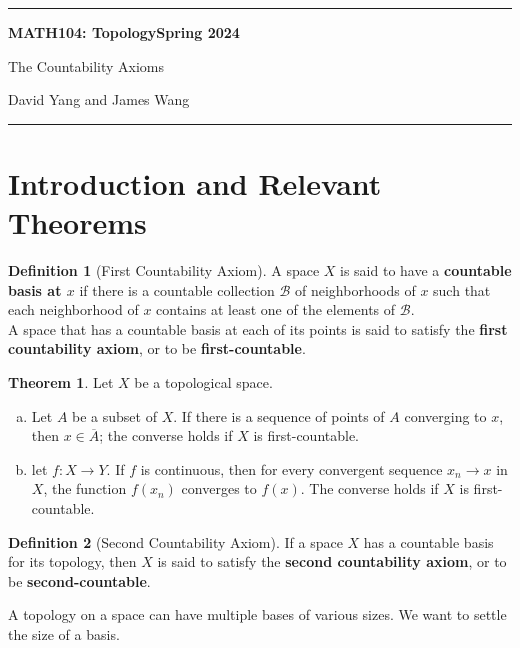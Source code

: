 \documentclass[11pt]{article}
\theoremstyle{definition}
\theoremstyle{theorem}
\newtheorem*{definition}{Definition}
\newtheorem*{theorem}{Theorem}
\begin{document}
	\hrule
	\begin{center}
        \textbf{MATH104: Topology}\hfill \textbf{Spring 2024}\newline

		{\Large The Countability Axioms}

		David Yang and James Wang
	\end{center}

\hrule

\vspace{1em}

\section{Introduction and Relevant Theorems}

\begin{definition}[First Countability Axiom]
A space $X$ is said to have a \textbf{countable basis at $x$} if there is a countable collection $\mathscr{B}$ of neighborhoods of $x$ such that each neighborhood of $x$ contains at least one of the elements of $\mathscr{B}$. \\

A space that has a countable basis at each of its points is said to satisfy the \textbf{first countability axiom}, or to be \textbf{first-countable}.
\end{definition}

\begin{theorem}
Let $X$ be a topological space. 
\begin{enumerate}[a)]
    \item Let $A$ be a subset of $X$. If there is a sequence of points of $A$ converging to $x$, then $x \in \overline{A}$; 
    the converse holds if $X$ is first-countable.
    \item let $f\colon X \rightarrow Y$. If $f$ is continuous, then for every convergent sequence $x_n \rightarrow x$ in $X$, the function
    $f(x_n)$ converges to $f(x)$. The converse holds if $X$ is first-countable.
\end{enumerate}
\end{theorem}

\begin{definition}[Second Countability Axiom]
If a space $X$ has a countable basis for its topology, then $X$ is said to satisfy the \textbf{second countability axiom}, or to be
\textbf{second-countable}.
\end{definition}

 A topology on a space can have multiple bases of various sizes. We want to settle the size of a basis.
\end{document}
